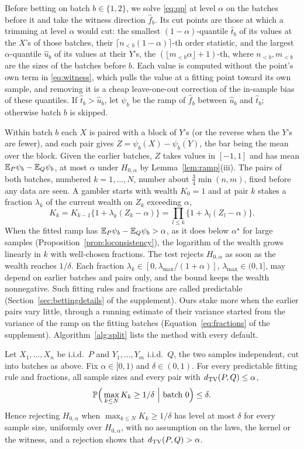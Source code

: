 Before betting on batch $b\in\{1,2\}$, we solve \eqref{eq:qp} at level $\alpha$ on the batches before it and take the
witness direction $\widehat f_b$. Its cut points are those at which a trimming at level $\alpha$ would cut: the
smallest $(1-\alpha)$-quantile $\widehat t_b$ of its values at the $X$'s of those batches, their
$\lceil n_{<b}(1-\alpha)\rceil$-th order statistic, and the largest $\alpha$-quantile $\widehat u_b$ of its values at
their $Y$'s, the $(\lfloor m_{<b}\alpha\rfloor+1)$-th, where $n_{<b},m_{<b}$ are the sizes of the batches before $b$.
Each value is computed without the point's own term in \eqref{eq:witness}, which pulls the value at a fitting point
toward its own sample, and removing it is a cheap leave-one-out correction of the in-sample bias of these quantiles.
If $\widehat t_b>\widehat u_b$, let $\psi_b$ be the ramp of $\widehat f_b$ between $\widehat u_b$ and $\widehat t_b$;
otherwise batch $b$ is skipped.

Within batch $b$ each $X$ is paired with a block of $Y$'s (or the reverse when the $Y$'s are fewer), and each pair
gives $Z=\psi_b(X)-\overline{\psi_b(Y)}$, the bar being the mean over the block. Given the earlier batches, $Z$ takes
values in $[-1,1]$ and has mean $\mathbb{E}_P\psi_b-\mathbb{E}_Q\psi_b$, at most $\alpha$ under $H_{0,\alpha}$ by
Lemma~\ref{lem:ramp}(iii). The pairs of both batches, numbered $k=1,\dots,N$, number about $\tfrac34\min(n,m)$, fixed
before any data are seen. A gambler starts with wealth $K_0=1$ and at pair $k$ stakes a fraction $\lambda_k$ of
the current wealth on $Z_k$ exceeding $\alpha$,
\[
K_k=K_{k-1}\{1+\lambda_k(Z_k-\alpha)\}=\prod_{l\le k}\{1+\lambda_l(Z_l-\alpha)\}.
\]
When the fitted ramp has $\mathbb{E}_P\psi_b-\mathbb{E}_Q\psi_b>\alpha$, as it does below $\alpha^\star$ for large samples
(Proposition~\ref{prop:loconsistency}), the logarithm of the wealth grows linearly in $k$ with well-chosen fractions.
The test rejects
$H_{0,\alpha}$ as soon as the wealth reaches $1/\delta$. Each fraction $\lambda_k\in[0,\lambda_{\max}/(1+\alpha)]$,
$\lambda_{\max}\in(0,1]$, may depend on earlier batches and pairs only, and the bound keeps the wealth nonnegative.
Such fitting rules and fractions are called predictable (Section~\ref{sec:bettingdetails} of the supplement). Ours stake more when the earlier pairs vary little, through a
running estimate of their variance started from the variance of the ramp on the fitting batches
(Equation~\eqref{eq:fractions} of the supplement). Algorithm~\ref{alg:split} lists the method with
every default.

\begin{theorem}
\label{thm:betting}
Let $X_1,\dots,X_n$ be i.i.d.\ $P$ and $Y_1,\dots,Y_m$ i.i.d.\ $Q$, the two samples independent, cut into batches as
above. Fix $\alpha\in[0,1)$ and $\delta\in(0,1)$. For every predictable fitting rule and fractions, all sample sizes and
every pair with $d_{\mathrm{TV}}(P,Q)\le\alpha$,
\[
\Pp\Big(\max_{k\le N}K_k\ge1/\delta\ \Big|\ \text{batch }0\Big)\le\delta .
\]
Hence rejecting $H_{0,\alpha}$ when $\max_{k\le N}K_k\ge1/\delta$ has level at most $\delta$ for every sample size,
uniformly over $H_{0,\alpha}$, with no assumption on the laws, the kernel or the witness, and a rejection shows that
$d_{\mathrm{TV}}(P,Q)>\alpha$.
\end{theorem}

